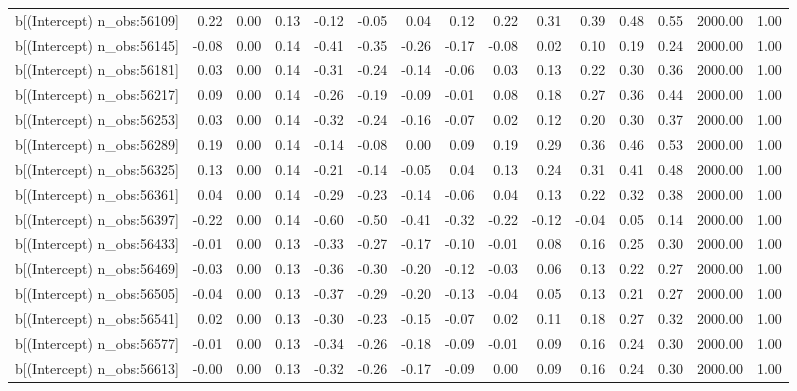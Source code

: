 \begin{table}[ht]
\begin{tabular}{rrrrrrrrrrrrrrr}
  b[(Intercept) n\_obs:56109] & 0.22 & 0.00 & 0.13 & -0.12 & -0.05 & 0.04 & 0.12 & 0.22 & 0.31 & 0.39 & 0.48 & 0.55 & 2000.00 & 1.00 \\ 
  b[(Intercept) n\_obs:56145] & -0.08 & 0.00 & 0.14 & -0.41 & -0.35 & -0.26 & -0.17 & -0.08 & 0.02 & 0.10 & 0.19 & 0.24 & 2000.00 & 1.00 \\ 
  b[(Intercept) n\_obs:56181] & 0.03 & 0.00 & 0.14 & -0.31 & -0.24 & -0.14 & -0.06 & 0.03 & 0.13 & 0.22 & 0.30 & 0.36 & 2000.00 & 1.00 \\ 
  b[(Intercept) n\_obs:56217] & 0.09 & 0.00 & 0.14 & -0.26 & -0.19 & -0.09 & -0.01 & 0.08 & 0.18 & 0.27 & 0.36 & 0.44 & 2000.00 & 1.00 \\ 
  b[(Intercept) n\_obs:56253] & 0.03 & 0.00 & 0.14 & -0.32 & -0.24 & -0.16 & -0.07 & 0.02 & 0.12 & 0.20 & 0.30 & 0.37 & 2000.00 & 1.00 \\ 
  b[(Intercept) n\_obs:56289] & 0.19 & 0.00 & 0.14 & -0.14 & -0.08 & 0.00 & 0.09 & 0.19 & 0.29 & 0.36 & 0.46 & 0.53 & 2000.00 & 1.00 \\ 
  b[(Intercept) n\_obs:56325] & 0.13 & 0.00 & 0.14 & -0.21 & -0.14 & -0.05 & 0.04 & 0.13 & 0.24 & 0.31 & 0.41 & 0.48 & 2000.00 & 1.00 \\ 
  b[(Intercept) n\_obs:56361] & 0.04 & 0.00 & 0.14 & -0.29 & -0.23 & -0.14 & -0.06 & 0.04 & 0.13 & 0.22 & 0.32 & 0.38 & 2000.00 & 1.00 \\ 
  b[(Intercept) n\_obs:56397] & -0.22 & 0.00 & 0.14 & -0.60 & -0.50 & -0.41 & -0.32 & -0.22 & -0.12 & -0.04 & 0.05 & 0.14 & 2000.00 & 1.00 \\ 
  b[(Intercept) n\_obs:56433] & -0.01 & 0.00 & 0.13 & -0.33 & -0.27 & -0.17 & -0.10 & -0.01 & 0.08 & 0.16 & 0.25 & 0.30 & 2000.00 & 1.00 \\ 
  b[(Intercept) n\_obs:56469] & -0.03 & 0.00 & 0.13 & -0.36 & -0.30 & -0.20 & -0.12 & -0.03 & 0.06 & 0.13 & 0.22 & 0.27 & 2000.00 & 1.00 \\ 
  b[(Intercept) n\_obs:56505] & -0.04 & 0.00 & 0.13 & -0.37 & -0.29 & -0.20 & -0.13 & -0.04 & 0.05 & 0.13 & 0.21 & 0.27 & 2000.00 & 1.00 \\ 
  b[(Intercept) n\_obs:56541] & 0.02 & 0.00 & 0.13 & -0.30 & -0.23 & -0.15 & -0.07 & 0.02 & 0.11 & 0.18 & 0.27 & 0.32 & 2000.00 & 1.00 \\ 
  b[(Intercept) n\_obs:56577] & -0.01 & 0.00 & 0.13 & -0.34 & -0.26 & -0.18 & -0.09 & -0.01 & 0.09 & 0.16 & 0.24 & 0.30 & 2000.00 & 1.00 \\ 
  b[(Intercept) n\_obs:56613] & -0.00 & 0.00 & 0.13 & -0.32 & -0.26 & -0.17 & -0.09 & 0.00 & 0.09 & 0.16 & 0.24 & 0.30 & 2000.00 & 1.00 \\ 

\end{tabular}
\end{table}
